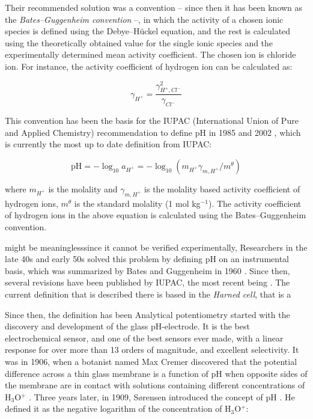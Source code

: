 \documentclass[manuscript=article, journal=jceda8]{achemso}
\begin{document}
Their recommended solution was a convention -- since then it has been known as the \emph{Bates--Guggenheim convention} --, in which the activity of a chosen ionic species is defined using the Debye--Hückel equation, and the rest is calculated using the theoretically obtained value for the single ionic species and the experimentally determined mean activity coefficient. The chosen ion is chloride ion. For instance, the activity coefficient of hydrogen ion can be calculated as:

\begin{equation}
\gamma_{H^+} = \frac{\gamma_{H^+, Cl^-}^2}{\gamma_{Cl^-}}
\end{equation}

This convention has been the basis for the IUPAC (International Union of Pure and Applied Chemistry) recommendation to define pH in 1985 \cite{covington1985definition} and 2002 \cite{buck2002measurement}, which is currently the most up to date definition from IUPAC:

\begin{equation}
\textrm{pH}= -\log_{10}a_{H^+} = -\log_{10}(m_{H^+} \gamma_{m, H^+}/m^\theta)
\end{equation}

where $m_{H^+}$ is the molality and $\gamma_{m, H^+}$ is the molality based activity coefficient of hydrogen ions, $m^\theta$ is the standard molality (1 mol kg$^{-1}$). The activity coefficient of hydrogen ions in the above equation is calculated using the Bates--Guggenheim convention.


   might be meaninglesssince it cannot be verified experimentally, Researchers in the late 40s and early 50s solved this problem by defining pH on an instrumental basis, which was summarized by Bates and Guggenheim in 1960 \cite{bates1960report}. Since then, several revisions have been published by IUPAC, the most recent being \cite{covington2002measurement}. The current definition that is described there is based in the \emph{Harned cell}, that is a 

Since then, the definition has been 
Analytical potentiometry started with the discovery and development of the glass pH-electrode. It is the best electrochemical sensor, and one of the best sensors ever made, with a linear response for over more than 13 orders of magnitude, and excellent selectivity.
It was in 1906, when a botanist named Max Cremer discovered that the potential difference across a thin glass membrane is a function of pH when opposite sides of the membrane are in contact with solutions containing different concentrations of H$_3$O$^+$ \cite{cremer1906ursache, cremer1906direkte}.
Three years later, in 1909, S\o rensen introduced the concept of pH \cite{sorensen1909messung}.
He defined it as the negative logarithm of the concentration of H$_3$O$^+$:
\end{document}
